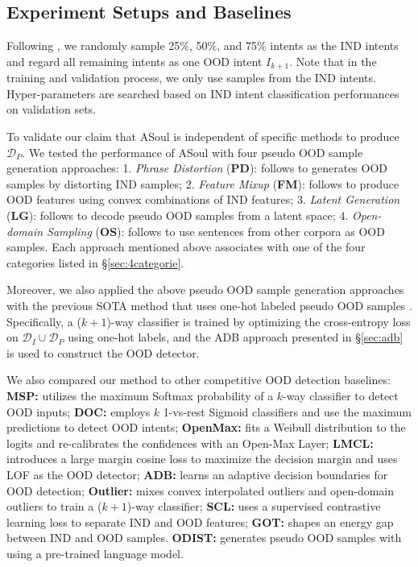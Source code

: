 \documentclass[11pt]{article}
\newcommand{\secref}[1]{\S\ref{#1}}
\begin{document}
\subsection{Experiment Setups and Baselines}\label{sec:baselines}
Following \cite{zhang2021deep,zhan2021out,shu2021odist}, we randomly sample 25\%, 50\%, and 75\% intents as the IND intents and regard all remaining intents as one OOD intent $I_{k+1}$. Note that in the training and validation process, we only use samples from the IND intents. Hyper-parameters are searched based on IND intent classification performances on validation sets.

To validate our claim that ASoul is independent of specific methods to produce $\mathcal{D}_P$. 
We tested the performance of ASoul with four pseudo OOD sample generation approaches:
1. \emph{Phrase Distortion} (\textbf{PD}): follows \citet{shu2021odist} to generates OOD samples by distorting IND samples;
2. \emph{Feature Mixup} (\textbf{FM}): follows \citet{zhan2021out} to produce OOD features using convex combinations of IND features;
3. \emph{Latent Generation} (\textbf{LG}): follows \citet{zheng2020out} to decode pseudo OOD samples from a latent space;
4. \emph{Open-domain Sampling} (\textbf{OS}): follows \citet{zhan2021out} to use sentences from other corpora as OOD samples. 
Each approach mentioned above associates with one of the four categories listed in \secref{sec:4categorie}.

Moreover, we also applied the above pseudo OOD sample generation approaches with the previous SOTA method that uses one-hot labeled pseudo OOD samples \cite{shu2021odist}.
Specifically, a ($k+1$)-way classifier is trained by optimizing the cross-entropy loss on $\mathcal{D}_I \cup \mathcal{D}_P$ using one-hot labels,
and the ADB approach presented in \secref{sec:adb} is used to construct the OOD detector.

We also compared our method to other competitive OOD detection baselines:
\textbf{MSP:} \citep{hendrycks2017baseline} utilizes the maximum Softmax probability of a $k$-way classifier to detect OOD inputs;
\textbf{DOC:} \citep{shu2017doc} employs $k$ 1-vs-rest Sigmoid classifiers and use the maximum predictions to detect OOD intents;
\textbf{OpenMax:} \citep{bendale2016towards} fits a Weibull distribution to the logits and re-calibrates the confidences with an Open-Max Layer;
\textbf{LMCL:} \citep{lin2019deep} introduces a large margin cosine loss to maximize the decision margin and uses LOF as the OOD detector;
\textbf{ADB:} \citep{zhang2021deep} learns an adaptive decision boundaries for OOD detection;
\textbf{Outlier:} \citep{zhan2021out} mixes convex interpolated outliers and open-domain outliers to train a ($k+1$)-way classifier;
\textbf{SCL:} \citep{zeng-etal-2021-modeling} uses a supervised contrastive learning loss to separate IND and OOD features;
\textbf{GOT:} \citep{ouyang2021energy} shapes an energy gap between IND and OOD samples.
\textbf{ODIST:} \citep{shu2021odist} generates pseudo OOD samples with using a pre-trained language model.
\end{document}
